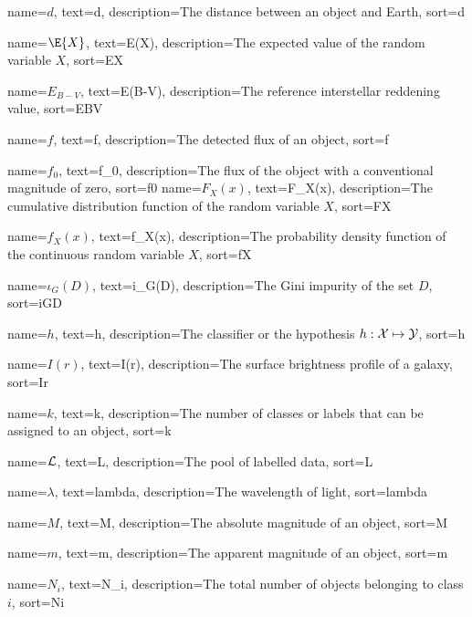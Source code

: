 %
{%
	name={$d$},
	text={d},
	description={The distance between an object and Earth},
	sort={d}
}

%
{%
	name={$\E{X}$},
	text={E(X)},
	description={The expected value of the random variable $X$},
	sort={EX}
}

%
{%
	name={$E_{B-V}$},
	text={E(B-V)},
	description={The reference interstellar reddening value},
	sort={EBV}
}

%
{%
	name={$f$},
	text={f},
	description={The detected flux of an object},
	sort={f}
}

%
{%
	name={$f_0$},
	text={f_0},
	description={The flux of the object with a conventional magnitude of zero},
	sort={f0}
}
%
{%
	name={$F_X(x)$},
	text={F_X(x)},
	description={The cumulative distribution function of the random variable $X$},
	sort={FX}
}

%
{%
	name={$f_X(x)$},
	text={f_X(x)},
	description={The probability density function of the continuous random variable $X$},
	sort={fX}
}

%
{%
	name={$\iota_G(D)$},
	text={i_G(D)},
	description={The Gini impurity of the set $D$},
	sort={iGD}
}

%
{%
	name={$h$},
	text={h},
	description={The classifier or the hypothesis $h: \mathcal{X} \mapsto \mathcal{Y}$},
	sort={h}
}

%
{%
	name={$I(r)$},
	text={I(r)},
	description={The surface brightness profile of a galaxy},
	sort={Ir}
}

%
{%
	name={$k$},
	text={k},
	description={The number of classes or labels that can be assigned to an object},
	sort={k}
}

%
{%
	name={$\mathcal{L}$},
	text={L},
	description={The pool of labelled data},
	sort={L}
}


%
{%
	name={$\lambda$},
	text={lambda},
	description={The wavelength of light},
	sort={lambda}
}

%
{%
	name={$M$},
	text={M},
	description={The absolute magnitude of an object},
	sort={M}
}

%
{%
	name={$m$},
	text={m},
	description={The apparent magnitude of an object},
	sort={m}
}

%
{%
	name={$N_i$},
	text={N_i},
	description={The total number of objects belonging to class $i$},
	sort={Ni}
}

